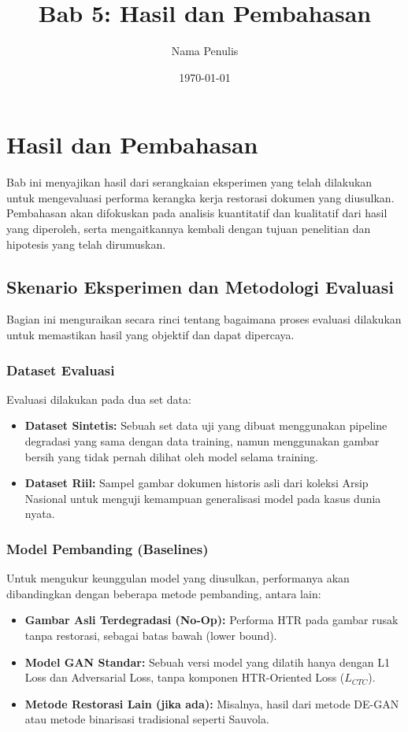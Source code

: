 \documentclass{article}
\title{Bab 5: Hasil dan Pembahasan}
\author{Nama Penulis}
\date{\today}
\begin{document}
\maketitle

\section{Hasil dan Pembahasan}

Bab ini menyajikan hasil dari serangkaian eksperimen yang telah dilakukan untuk mengevaluasi performa kerangka kerja restorasi dokumen yang diusulkan. Pembahasan akan difokuskan pada analisis kuantitatif dan kualitatif dari hasil yang diperoleh, serta mengaitkannya kembali dengan tujuan penelitian dan hipotesis yang telah dirumuskan.

\subsection{Skenario Eksperimen dan Metodologi Evaluasi}

Bagian ini menguraikan secara rinci tentang bagaimana proses evaluasi dilakukan untuk memastikan hasil yang objektif dan dapat dipercaya.

\subsubsection{Dataset Evaluasi}
Evaluasi dilakukan pada dua set data:
\begin{itemize}
    \item \textbf{Dataset Sintetis:} Sebuah set data uji yang dibuat menggunakan pipeline degradasi yang sama dengan data training, namun menggunakan gambar bersih yang tidak pernah dilihat oleh model selama training.
    \item \textbf{Dataset Riil:} Sampel gambar dokumen historis asli dari koleksi Arsip Nasional untuk menguji kemampuan generalisasi model pada kasus dunia nyata.
\end{itemize}

\subsubsection{Model Pembanding (Baselines)}
Untuk mengukur keunggulan model yang diusulkan, performanya akan dibandingkan dengan beberapa metode pembanding, antara lain:
\begin{itemize}
    \item \textbf{Gambar Asli Terdegradasi (No-Op):} Performa HTR pada gambar rusak tanpa restorasi, sebagai batas bawah (lower bound).
    \item \textbf{Model GAN Standar:} Sebuah versi model yang dilatih hanya dengan L1 Loss dan Adversarial Loss, tanpa komponen HTR-Oriented Loss ($L_{CTC}$).
    \item \textbf{Metode Restorasi Lain (jika ada):} Misalnya, hasil dari metode DE-GAN atau metode binarisasi tradisional seperti Sauvola.
\end{itemize}
\end{document}
